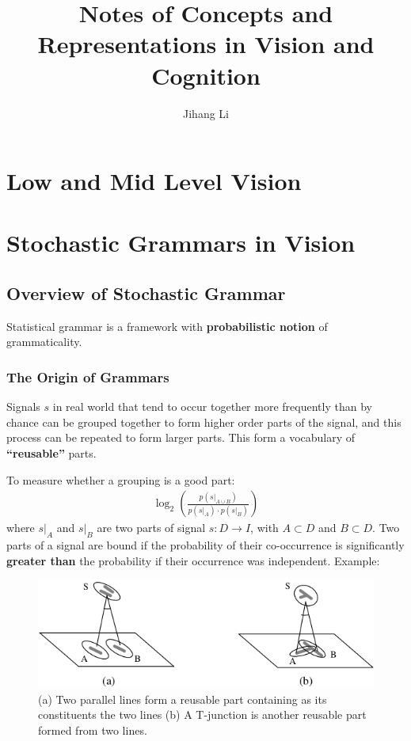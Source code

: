 \documentclass[10pt,oneside]{book}
\title{Notes of Concepts and Representations in Vision and Cognition}
\author{Jihang Li}
\begin{document}
\maketitle
\tableofcontents

\part{Low and Mid Level Vision}%


\part{Stochastic Grammars in Vision}%
\chapter{Overview of Stochastic Grammar}%
\label{sec:1}
Statistical grammar is a framework with \textbf{probabilistic notion} of
grammaticality.

\section{The Origin of Grammars}%
\label{sec:1.1}
Signals $s$ in real world that tend to occur together more frequently than by
chance can be grouped together to form higher order parts of the signal, and
this process can be repeated to form larger parts. This form a vocabulary of
\textbf{``reusable''} parts.

To measure whether a grouping is a good part:
%
\begin{align}
  \label{eq:1.1}
  \log_2 \left( \frac{p(s\vert_{A \cup B})}{p(s\vert_{A}) \cdot p(s\vert_{B})} \right)
\end{align}
%
where $s\vert_{A}$ and $s\vert_{B}$ are two parts of signal $s: D \rightarrow I$,
with $A \subset D$ and $B \subset D$. Two parts of a signal are bound if the
probability of their co-occurrence is significantly \textbf{greater than} the
probability if their occurrence was independent. Example:
%
\begin{figure}[!htpb]
  \centering
  \includegraphics[width=0.7\linewidth]{./fig/fig_1_1.png}
  \caption{(a) Two parallel lines form a reusable part containing as its
    constituents the two lines (b) A T-junction is another reusable part formed
    from two lines.}%
  \label{fig:1.1}
\end{figure}
%
\end{document}
